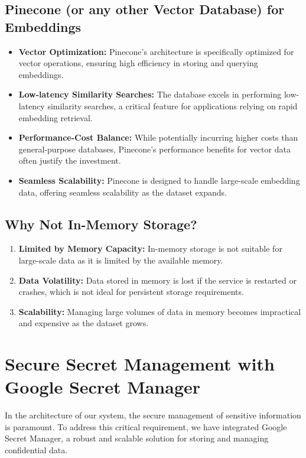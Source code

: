 \documentclass[a4paper, 12pt]{report}
\begin{document}
\subsection*{Pinecone (or any other Vector Database) for Embeddings}
\begin{itemize}
    \item \textbf{Vector Optimization:} Pinecone's architecture is specifically optimized for vector operations, ensuring high efficiency in storing and querying embeddings.
    \item \textbf{Low-latency Similarity Searches:} The database excels in performing low-latency similarity searches, a critical feature for applications relying on rapid embedding retrieval.
    \item \textbf{Performance-Cost Balance:} While potentially incurring higher costs than general-purpose databases, Pinecone's performance benefits for vector data often justify the investment.
    \item \textbf{Seamless Scalability:} Pinecone is designed to handle large-scale embedding data, offering seamless scalability as the dataset expands.
\end{itemize}

\subsection*{Why Not In-Memory Storage?}
\begin{enumerate}
    \item \textbf{Limited by Memory Capacity:} In-memory storage is not suitable for large-scale data as it is limited by the available memory.
    \item \textbf{Data Volatility:} Data stored in memory is lost if the service is restarted or crashes, which is not ideal for persistent storage requirements.
    \item \textbf{Scalability:} Managing large volumes of data in memory becomes impractical and expensive as the dataset grows.
\end{enumerate}


\section{Secure Secret Management with Google Secret Manager}
In the architecture of our system, the secure management of sensitive information is paramount. To address this critical requirement, we have integrated Google Secret Manager, a robust and scalable solution for storing and managing confidential data.
\end{document}

